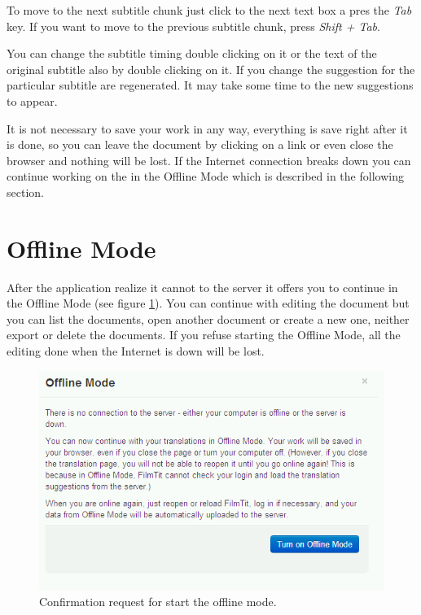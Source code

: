 To move to the next subtitle chunk just click to the next text box a pres the \emph{Tab} key. If you want to move to the previous subtitle chunk, press \emph{Shift + Tab}.

You can change the subtitle timing double clicking on it or the text of the original subtitle also by double clicking on it. If you change the suggestion for the particular subtitle are regenerated. It may take some time to the new suggestions to appear.

It is not necessary to save your work in any way, everything is save right after it is done, so you can leave the document by clicking on a link or even close the browser and nothing will be lost. If the Internet connection breaks down you can continue working on the in the Offline Mode which is described in the following section.

\section{Offline Mode}

After the application realize it cannot to the server it offers you to continue in the Offline Mode (see figure \ref{fig:start_offline_mode}). You can continue with editing the document but you can list the documents, open another document or create a new one, neither export or delete the documents. If you refuse starting the Offline Mode, all the editing done when the Internet is down will be lost.

\begin{figure}
\begin{center}
\includegraphics[scale=0.4]{figures/user_manual/offline_mode.png}
\end{center}
\caption{Confirmation request for start the offline mode.}
\label{fig:start_offline_mode}
\end{figure}

